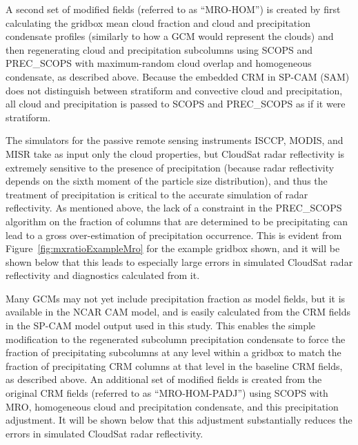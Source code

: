 A second set of modified fields (referred to as ``MRO-HOM'') is created
by first calculating the gridbox mean cloud fraction and cloud and
precipitation condensate profiles (similarly to how a GCM would
represent the clouds) and then regenerating cloud and precipitation
subcolumns using SCOPS and PREC\_SCOPS with maximum-random cloud overlap
and homogeneous condensate, as described above. Because the embedded CRM
in SP-CAM (SAM) does not distinguish between stratiform and convective
cloud and precipitation, all cloud and precipitation is passed to SCOPS
and PREC\_SCOPS as if it were stratiform.

The simulators for the passive remote sensing instruments ISCCP, MODIS,
and MISR take as input only the cloud properties, but CloudSat radar
reflectivity is extremely sensitive to the presence of precipitation
(because radar reflectivity depends on the sixth moment of the particle
size distribution), and thus the treatment of precipitation is critical
to the accurate simulation of radar reflectivity. As mentioned above,
the lack of a constraint in the PREC\_SCOPS algorithm on the fraction of
columns that are determined to be precipitating can lead to a gross
over-estimation of precipitation occurrence. This is evident from
Figure~\ref{fig:mxratioExampleMro} for the example gridbox shown, and it
will be shown below that this leads to especially large errors in
simulated CloudSat radar reflectivity and diagnostics calculated from
it.

Many GCMs may not yet include precipitation fraction as model fields,
but it is available in the NCAR CAM model, and is easily calculated from
the CRM fields in the SP-CAM model output used in this study. This
enables the simple modification to the regenerated subcolumn
precipitation condensate to force the fraction of precipitating
subcolumns at any level within a gridbox to match the fraction of
precipitating CRM columns at that level in the baseline CRM fields, as
described above. An additional set of modified fields is created from
the original CRM fields (referred to as ``MRO-HOM-PADJ'') using SCOPS
with MRO, homogeneous cloud and precipitation condensate, and this
precipitation adjustment. It will be shown below that this adjustment
substantially reduces the errors in simulated CloudSat radar
reflectivity.

